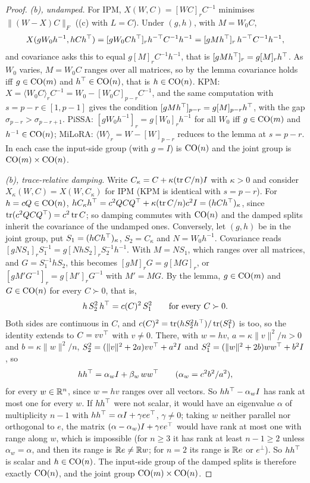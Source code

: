 \begin{proof}
\emph{(b), undamped.} For IPM, $X(W,C)=[WC]_rC^{-1}$ minimises $\lVert(W-X)C\rVert_F$ ((c) with $L=C$). Under
$(g,h)$, with $M=W_0C$,
\begin{equation*}
  X(gW_0h^{-1},hCh^{\top})=[gW_0Ch^{\top}]_rh^{-\top}C^{-1}h^{-1}=[gMh^{\top}]_r\,h^{-\top}C^{-1}h^{-1},
\end{equation*}
and covariance asks this to equal $g[M]_rC^{-1}h^{-1}$, that is $[gMh^{\top}]_r=g[M]_rh^{\top}$. As $W_0$ varies, $M=W_0C$ ranges over all
matrices, so by the lemma covariance holds iff $g\in\mathrm{CO}(m)$ and $h^{\top}\in\mathrm{CO}(n)$, that is $h\in\mathrm{CO}(n)$. KPM:
$X=\langle W_0C\rangle_rC^{-1}=W_0-[W_0C]_{p-r}C^{-1}$, and the same computation with $s=p-r\in[1,p-1]$ gives the condition
$[gMh^{\top}]_{p-r}=g[M]_{p-r}h^{\top}$, with the gap $\sigma_{p-r}>\sigma_{p-r+1}$. PiSSA: $[gW_0h^{-1}]_r=g[W_0]_rh^{-1}$ for all $W_0$ iff
$g\in\mathrm{CO}(m)$ and $h^{-1}\in\mathrm{CO}(n)$; MiLoRA: $\langle W\rangle_r=W-[W]_{p-r}$ reduces to the lemma at $s=p-r$. In each case the
input-side group (with $g=I$) is $\mathrm{CO}(n)$ and the joint group is $\mathrm{CO}(m)\times\mathrm{CO}(n)$.

\emph{(b), trace-relative damping.} Write $C_\kappa=C+\kappa(\operatorname{tr} C/n)I$ with $\kappa>0$ and consider $X_\kappa(W,C)=X(W,C_\kappa)$
for IPM (KPM is identical with $s=p-r$). For $h=cQ\in\mathrm{CO}(n)$,
$hC_\kappa h^{\top}=c^2QCQ^{\top}+\kappa(\operatorname{tr} C/n)c^2I=(hCh^{\top})_\kappa$, since $\operatorname{tr}(c^2QCQ^{\top})=c^2\operatorname{tr} C$; so damping commutes with $\mathrm{CO}(n)$ and
the damped splits inherit the covariance of the undamped ones. Conversely, let $(g,h)$ be in the joint group, put
$S_1=(hCh^{\top})_\kappa$, $S_2=C_\kappa$ and $N=W_0h^{-1}$. Covariance reads $[gNS_1]_rS_1^{-1}=g[NhS_2]_rS_2^{-1}h^{-1}$. With
$M=NS_1$, which ranges over all matrices, and $G=S_1^{-1}hS_2$, this becomes $[gM]_rG=g[MG]_r$, or $[gM'G^{-1}]_r=g[M']_rG^{-1}$
with $M'=MG$. By the lemma, $g\in\mathrm{CO}(m)$ and $G\in\mathrm{CO}(n)$ for every $C\succ0$, that is,
\begin{equation*}
  h\,S_2^2\,h^{\top}=c(C)^2\,S_1^2\qquad\text{for every }C\succ0 .
\end{equation*}
Both sides are continuous in $C$, and $c(C)^2=\operatorname{tr}(hS_2^2h^{\top})/\operatorname{tr}(S_1^2)$ is too, so the identity extends to $C=vv^{\top}$ with $v\ne0$.
There, with $w=hv$, $a=\kappa\lVert v\rVert^2/n>0$ and $b=\kappa\lVert w\rVert^2/n$,
$S_2^2=(\lVert v\rVert^2+2a)vv^{\top}+a^2I$ and $S_1^2=(\lVert w\rVert^2+2b)ww^{\top}+b^2I$, so
\begin{equation*}
  hh^{\top}=\alpha_wI+\beta_w\,ww^{\top}\qquad(\alpha_w=c^2b^2/a^2),
\end{equation*}
for every $w\in\mathbb{R}^n$, since $w=hv$ ranges over all vectors. So $hh^{\top}-\alpha_wI$ has rank at most one for every $w$. If $hh^{\top}$
were not scalar, it would have an eigenvalue $\alpha$ of multiplicity $n-1$ with $hh^{\top}=\alpha I+\gamma ee^{\top}$, $\gamma\ne0$; taking
$w$ neither parallel nor orthogonal to $e$, the matrix $(\alpha-\alpha_w)I+\gamma ee^{\top}$ would have rank at most one with range
along $w$, which is impossible (for $n\ge3$ it has rank at least $n-1\ge2$ unless $\alpha_w=\alpha$, and then its range is
$\mathbb{R} e\ne\mathbb{R} w$; for $n=2$ its range is $\mathbb{R} e$ or $e^\perp$). So $hh^{\top}$ is scalar and $h\in\mathrm{CO}(n)$. The input-side group of the damped
splits is therefore exactly $\mathrm{CO}(n)$, and the joint group $\mathrm{CO}(m)\times\mathrm{CO}(n)$.


\end{proof}
